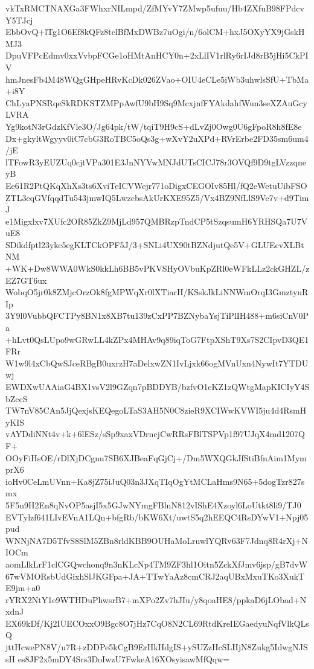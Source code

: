vkTxRMCTNAXGa3FWhxrNILmpd/ZfMYvY7ZMwp5ufuu/Hb4ZXfuB98FPdcvY5TJcj
EbbOvQ+lTg1O6Ef8kQFz8telBfMxDWBz7uOgi/n/6olCM+hxJ5OXyYX9jGskHMJ3
DpuVFPcEdmv0xxVvbpFCGe1oHMtAnHCY0n+2xLlIV1rlRy6rIJd8rB5jHi5CkPIV
hmJnesFb4M48WQgGHpeHRvKcDk026ZVao+OIU4eCLe5iWb3uhwlsSfU+TbMa+i8Y
ChLyaPNSRqeSkRDKSTZMPpAwfU9bH9Sq9McxjnfFYAkdahfWun3seXZAuGcyLVRA
Yg9kotN3rGdzKfVle3O/Jg64pk/tW/tqiT9H9cS+dLvZj0Owg0U6gFpoR8h8fE8e
Dx+gkyltWgyyv0iC7cbG3RoTBC5oQs3g+wXvY2uXPd+RVrErbe2FD35sm6um4/jE
lTFowR3yEUZUq0cjtVPa301E3JnNYVwMNJdUTsCICJ78r3OVQf9D9tgLVzzqneyB
Ee61R2PtQKqXhXs3ts6XviTeICVWejr771oDigxCEGOIv85Hl/fQ2eWetuUibFSO
ZTL3eqGVfqqdTu543jmwIQ5LwzcbsAkUrKXE95Z5/Vx4BZ9NfLlS9Ve7v+d9TimJ
e1Migxlxv7XUfc2OR85ZkZ9MjLd957QMBRzpTndCP5tSzqsumH6YRHSQa7U7VuE8
SDikdfptl23ykc5egKLTCkOPF5J/3+SNLi4UX90tBZNdjutQe5V+GLUEcvXLBtNM
+WK+Dw8WWA0WkS0kkLh6BB5vPKVSHyOVbuKpZRl0eWFkLLz2ckGHZL/zEZ7GT6ux
WobqO5jr0k8ZMjcOrzOk8fgMPWqXr0lXTiarH/KSskJkLiNNWmOrqI3GmztyuRIp
3Y9l0VubbQFCTPy8BN1x8XB7tu139zCxPP7BZNybaYsjTiPlIH488+m6siCnV0Pa
+hLvt0QsLUpo9wGRwLL4kZPx4MHAv9q89iqToG7FtpXShT9Xs7S2CIpvD3QE1FRr
W1w9l4xCbQwSJceRBgB0uxrzH7aDelxwZN1IvLjxk66ogMVnUxn4NywIt7YTDUwj
EWDXwUAAiaG4BX1vsV2l9GZqn7pBDDYB/bzfvO1eKZ1zQWtgMapKICIyY4SbZccS
TW7nV85CAn5JjQexjsKEQegoLTaS3AH5N0C8zieR9XCIWwKVWI5ju4d4RsmHyKIS
vAYDdiNNt4v+k+6lESz/sSp9xaxVDrncjCwRRsFBlTSPVp1f97UJqX4md1207QF+
OOyFiHsOE/rDlXjDCgnu7SB6XJBeaFqGjCj+/Dm5WXQGkJfStiBfnAim1MymprX6
ioHv0CeLmUVnn+Ka8jZ75iJuQ03n3JXqTIqOgYtMCLaHms9N65+5dogTzr827smx
5F5n9H2En8qNvOP5asjI5x5GJwNYmgFBlnN812vIShE4Xzoyl6LoUtkt8li9/TJ0
EVTylzf641LIvEVnA1LQn+bfgRb/bKW6Xt/uwtS5q2hEEQC4RsDYwV1+Npj05pud
WNNjNA7D5TfvS8SlM5ZBn8rldKBB9OUHaMoLruwlYQRv63F7Jdnq8R4rXj+NIOCm
aomLlkLrF1clCGQwchonq9n3nKLcNp4TM9ZF3hl1Oitn5ZckXfJmv6jsp/gB7dvW
67wVMORsbUdGixhSlJKGFpa+JA+TTwYaAz8cmCRJ2aqUBxMxuTKo3XukTE9jm+a0
rYRX2NtY1e9WTHDuPhwsrB7+mXPo2Zv7hJIu/y8qoaHE8/ppkaD6jLObad+NxdnJ
EX69kDf/Kj2IUECOxxO9Bgc8O7jHz7CqO8N2CL69RtdKreIEGaedyuNqfVlkQLsQ
jttHcwePN8V/u7R+zDDPe5kCgB9ErHkHdgIS+ySUZzHcSLHjN8Zukg5IdwgNJSsH
es8JF2x5mDY4Srs3DoIwzU7FwkeA16XOsyisawMfQqw=
